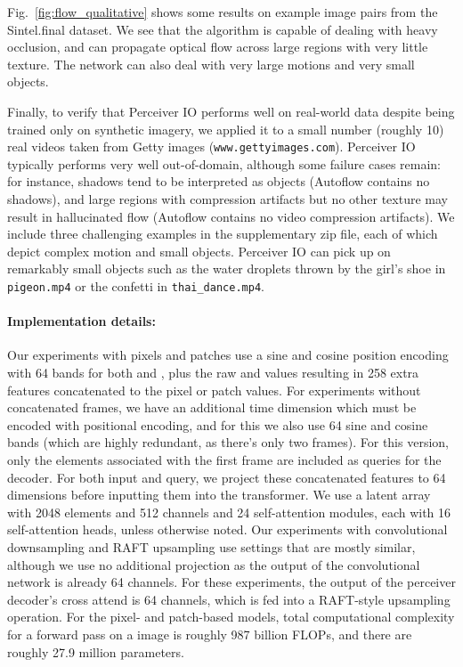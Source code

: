 \documentclass{article} \usepackage{iclr2022_conference,times}
\newcommand{\ourmodel}{Perceiver IO\xspace}
\begin{document}
Fig.~\ref{fig:flow_qualitative} shows some results on example image pairs from the Sintel.final dataset.  We see that the algorithm is capable of dealing with heavy occlusion, and can propagate optical flow across large regions with very little texture.  The network can also deal with very large motions and very small objects.
 
Finally, to verify that \ourmodel{} performs well on real-world data despite being trained only on synthetic imagery, we applied it to a small number (roughly 10) real videos taken from Getty images (\texttt{www.gettyimages.com}).  \ourmodel typically performs very well out-of-domain, although some failure cases remain: for instance, shadows tend to be interpreted as objects (Autoflow contains no shadows), and large regions with compression artifacts but no other texture may result in hallucinated flow (Autoflow contains no video compression artifacts).  We include three challenging examples in the supplementary zip file, each of which depict complex motion and small objects. Perceiver IO can pick up on remarkably small objects such as the water droplets thrown by the girl's shoe in \texttt{pigeon.mp4} or the confetti in \texttt{thai\_dance.mp4}.  

\paragraph{Implementation details:} Our experiments with pixels and patches use a sine and cosine position encoding with 64 bands for both  and , plus the raw  and  values resulting in 258 extra features concatenated to the pixel or patch values. For experiments without concatenated frames, we have an additional time dimension which must be encoded with positional encoding, and for this we also use 64 sine and cosine bands (which are highly redundant, as there's only two frames).  For this version, only the elements associated with the first frame are included as queries for the decoder.  For both input and query, we project these concatenated features to 64 dimensions before inputting them into the transformer. We use a latent array with 2048 elements and 512 channels and 24 self-attention modules, each with 16 self-attention heads, unless otherwise noted.  Our experiments with convolutional downsampling and RAFT upsampling use settings that are mostly similar, although we use no additional projection as the output of the convolutional network is already 64 channels. For these experiments, the output of the perceiver decoder's cross attend is 64 channels, which is fed into a RAFT-style upsampling operation.  For the pixel- and patch-based models, total computational complexity for a forward pass on a  image is roughly 987 billion FLOPs, and there are roughly 27.9 million parameters. 
\end{document}
